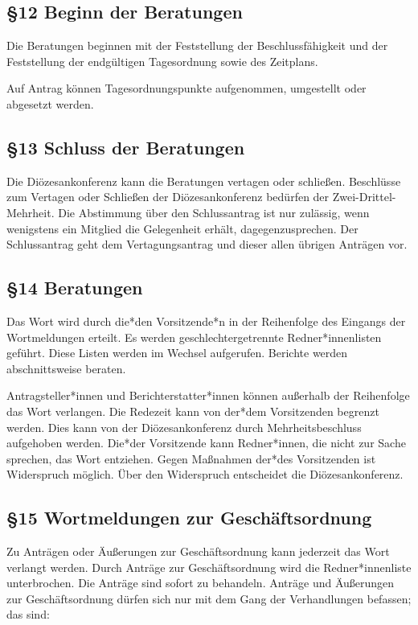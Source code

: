\documentclass[12pt]{report}
\begin{document}
\begin{justify}
\subsection*{§12 Beginn der Beratungen}
Die Beratungen beginnen mit der Feststellung der Beschlussfähigkeit und der Feststellung der endgültigen
Tagesordnung sowie des Zeitplans.

Auf Antrag können Tagesordnungspunkte aufgenommen, umgestellt oder abgesetzt werden.
\subsection*{§13 Schluss der Beratungen}
Die Diözesankonferenz kann die Beratungen vertagen oder schließen. Beschlüsse zum Vertagen oder Schließen
der Diözesankonferenz bedürfen der Zwei-Drittel-Mehrheit. Die Abstimmung über den Schlussantrag ist
nur zulässig, wenn wenigstens ein Mitglied die Gelegenheit erhält, dagegenzusprechen. Der Schlussantrag
geht dem Vertagungsantrag und dieser allen übrigen Anträgen vor.
\subsection*{§14 Beratungen}
Das Wort wird durch die*den Vorsitzende*n in der Reihenfolge des Eingangs der Wortmeldungen erteilt.
Es werden geschlechtergetrennte Redner*innenlisten geführt. Diese Listen werden im Wechsel aufgerufen.
Berichte werden abschnittsweise beraten.

Antragsteller*innen und Berichterstatter*innen können außerhalb der Reihenfolge das Wort verlangen. Die Redezeit
kann von der*dem Vorsitzenden begrenzt werden. Dies kann von der Diözesankonferenz durch Mehrheitsbeschluss
aufgehoben werden. Die*der Vorsitzende kann Redner*innen, die nicht zur Sache sprechen, das
Wort entziehen. Gegen Maßnahmen der*des Vorsitzenden ist Widerspruch möglich. Über den Widerspruch
entscheidet die Diözesankonferenz.

\subsection*{§15 Wortmeldungen zur Geschäftsordnung}
Zu Anträgen oder Äußerungen zur Geschäftsordnung kann jederzeit das Wort verlangt werden.
Durch Anträge zur Geschäftsordnung wird die Redner*innenliste unterbrochen. Die Anträge sind sofort zu
behandeln. Anträge und Äußerungen zur Geschäftsordnung dürfen sich nur mit dem Gang der Verhandlungen
befassen; das sind:


\end{justify}
\end{document}
